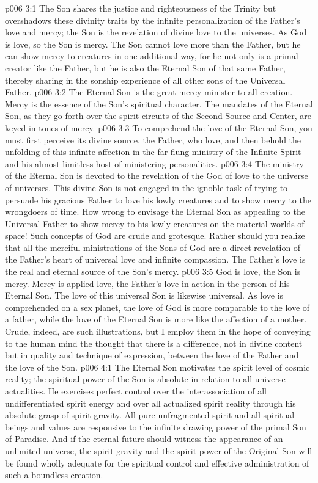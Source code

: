 \vs p006 3:1 The Son shares the justice and righteousness of the Trinity but overshadows these divinity traits by the infinite personalization of the Father’s love and mercy; the Son is the revelation of divine love to the universes. As God is love, so the Son is mercy. The Son cannot love more than the Father, but he can show mercy to creatures in one additional way, for he not only is a primal creator like the Father, but he is also the Eternal Son of that same Father, thereby sharing in the sonship experience of all other sons of the Universal Father.
\vs p006 3:2 The Eternal Son is the great mercy minister to all creation. Mercy is the essence of the Son’s spiritual character. The mandates of the Eternal Son, as they go forth over the spirit circuits of the Second Source and Center, are keyed in tones of mercy.
\vs p006 3:3 To comprehend the love of the Eternal Son, you must first perceive its divine source, the Father, who  love, and then behold the unfolding of this infinite affection in the far\hyp{}flung ministry of the Infinite Spirit and his almost limitless host of ministering personalities.
\vs p006 3:4 The ministry of the Eternal Son is devoted to the revelation of the God of love to the universe of universes. This divine Son is not engaged in the ignoble task of trying to persuade his gracious Father to love his lowly creatures and to show mercy to the wrongdoers of time. How wrong to envisage the Eternal Son as appealing to the Universal Father to show mercy to his lowly creatures on the material worlds of space! Such concepts of God are crude and grotesque. Rather should you realize that all the merciful ministrations of the Sons of God are a direct revelation of the Father’s heart of universal love and infinite compassion. The Father’s love is the real and eternal source of the Son’s mercy.
\vs p006 3:5 God is love, the Son is mercy. Mercy is applied love, the Father’s love in action in the person of his Eternal Son. The love of this universal Son is likewise universal. As love is comprehended on a sex planet, the love of God is more comparable to the love of a father, while the love of the Eternal Son is more like the affection of a mother. Crude, indeed, are such illustrations, but I employ them in the hope of conveying to the human mind the thought that there is a difference, not in divine content but in quality and technique of expression, between the love of the Father and the love of the Son.
\vs p006 4:1 The Eternal Son motivates the spirit level of cosmic reality; the spiritual power of the Son is absolute in relation to all universe actualities. He exercises perfect control over the interassociation of all undifferentiated spirit energy and over all actualized spirit reality through his absolute grasp of spirit gravity. All pure unfragmented spirit and all spiritual beings and values are responsive to the infinite drawing power of the primal Son of Paradise. And if the eternal future should witness the appearance of an unlimited universe, the spirit gravity and the spirit power of the Original Son will be found wholly adequate for the spiritual control and effective administration of such a boundless creation.
